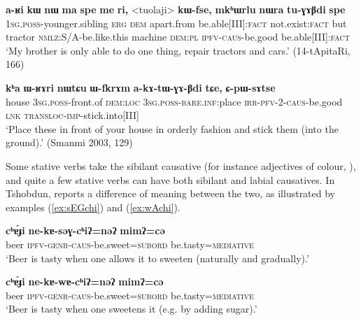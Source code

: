 \documentclass[oneside,a4paper,11pt]{article}
\newcommand{\ipa}[1]{\textbf{{\phon\mbox{#1}}}} %
\newcommand{\refb}[1]{(\ref{#1})}
\begin{document}
\begin{exe}
\ex \label{ex:tuGABdi}
 \gll \ipa{a-ʁi} 	\ipa{kɯ} 	\ipa{nɯ} 	\ipa{ma} 	\ipa{spe} 	\ipa{me} 	\ipa{ri,} 	<tuolaji> 	\ipa{kɯ-fse,} 	\ipa{mkʰɯrlu} 	\ipa{nɯra} 	\ipa{tu-ɣɤβdi} 	\ipa{spe} \\
 \textsc{1sg.poss}-younger.sibling \textsc{erg} \textsc{dem} apart.from be.able[III]:\textsc{fact} not.exist:\textsc{fact} but tractor \textsc{nmlz}:S/A-be.like.this machine \textsc{dem:pl} \textsc{ipfv-caus}-be.good be.able[III]:\textsc{fact} \\
 \glt `My brother is only able to do one thing, repair tractors and cars.' (14-tApitaRi, 166)
\end{exe}

\begin{exe}
\ex \label{ex:akAtWGABdi}
\gll \ipa{kʰa} 	\ipa{ɯ-ʁɤri} 	\ipa{nɯtɕu} 	\ipa{ɯ-fkrɤm} 	\ipa{a-kɤ-tɯ-ɣɤ-βdi} 	\ipa{tɕe,} 	\ipa{ɕ-pɯ-sɤtse} \\
house \textsc{3sg.poss}-front.of \textsc{dem:loc} \textsc{3sg.poss-bare.inf}:place \textsc{irr-pfv-2-caus}-be.good \textsc{lnk} \textsc{transloc-imp}-stick.into[III] \\
\glt `Place these in front of your house in orderly fashion and stick them (into the ground).' (Smanmi 2003, 129)
\end{exe}


Some stative verbs take the sibilant causative (for instance adjectives of colour, \citealt[183]{jacques15causative}), and quite a few stative verbs can have both sibilant and labial causatives. In Tshobdun, \citet{jackson06paisheng, jackson14morpho} reports a difference of meaning between the two, as illustrated by examples \refb{ex:sEGchi} and \refb{ex:wAchi}.

\begin{exe}
\ex \label{ex:sEGchi}
\gll \ipa{cʰɐ́ɟi}	\ipa{ne-kɐ-səɣ-cʰiʔ=nəʔ}	\ipa{mimʔ=cə} \\
beer \textsc{ipfv-genr-caus}-be.sweet=\textsc{subord} be.tasty=\textsc{mediative} \\
\glt `Beer is tasty when one allows it to sweeten (naturally and gradually).'
\end{exe}

 \begin{exe}
\ex \label{ex:wAchi}
\gll \ipa{cʰɐ́ɟi}	\ipa{ne-kɐ-wɐ-cʰiʔ=nəʔ}	\ipa{mimʔ=cə} \\
beer \textsc{ipfv-genr-caus}-be.sweet=\textsc{subord} be.tasty=\textsc{mediative} \\
\glt `Beer is tasty when one sweetens it (e.g. by adding sugar).'
\end{exe}
\end{document}
